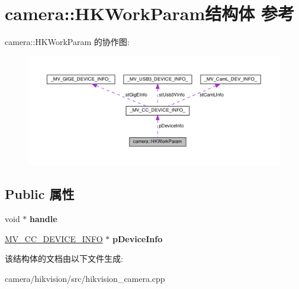 \hypertarget{structcamera_1_1_h_k_work_param}{}\section{camera\+:\+:H\+K\+Work\+Param结构体 参考}
\label{structcamera_1_1_h_k_work_param}


camera\+:\+:H\+K\+Work\+Param 的协作图\+:\nopagebreak
\begin{figure}[H]
\begin{center}
\leavevmode
\includegraphics[width=350pt]{structcamera_1_1_h_k_work_param__coll__graph}
\end{center}
\end{figure}
\subsection*{Public 属性}
\begin{DoxyCompactItemize}
\item 
\mbox{\label{structcamera_1_1_h_k_work_param_a1ad1b5015e364dea9367122b16f01727}} 
void $\ast$ {\bfseries handle}
\item 
\mbox{\label{structcamera_1_1_h_k_work_param_a57e297a0e197c238e14744a0743a5e0c}} 
\hyperlink{struct___m_v___c_c___d_e_v_i_c_e___i_n_f_o__}{M\+V\+\_\+\+C\+C\+\_\+\+D\+E\+V\+I\+C\+E\+\_\+\+I\+N\+FO} $\ast$ {\bfseries p\+Device\+Info}
\end{DoxyCompactItemize}


该结构体的文档由以下文件生成\+:\begin{DoxyCompactItemize}
\item 
camera/hikvision/src/hikvision\+\_\+camera.\+cpp\end{DoxyCompactItemize}
